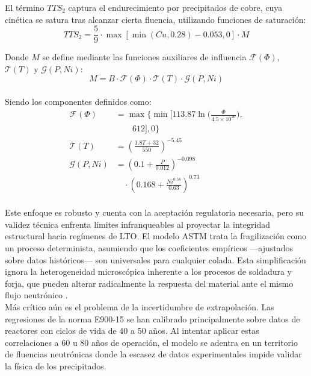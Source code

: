 \documentclass[a4paper, 12pt, twocolumn]{book}
\begin{document}
El término $TTS_2$ captura el endurecimiento por precipitados de cobre, cuya cinética se satura tras alcanzar cierta fluencia, utilizando funciones de saturación:\\
$$ TTS_2 = \frac{5}{9} \cdot \max \left[ \min (Cu, 0.28) - 0.053, 0 \right] \cdot M $$

Donde $M$ se define mediante las funciones auxiliares de influencia $\mathcal{F}(\Phi)$, $\mathcal{T}(T)$ y $\mathcal{G}(P, Ni)$:\\

\begin{equation}
M = B \cdot \mathcal{F}(\Phi) \cdot \mathcal{T}(T) \cdot \mathcal{G}(P, Ni)
\end{equation}\\

Siendo los componentes definidos como:\\

{\small
\begin{align*}
\mathcal{F}(\Phi) &= \max \bigg\{ \min \Big[ 113.87 \ln \Big( \frac{\Phi}{4.5 \times 10^{20}} \Big), \\
& \quad \quad 612 \Big], 0 \bigg\} \\[6pt]
\mathcal{T}(T) &= \left( \frac{1.8T + 32}{550} \right)^{-5.45} \\[6pt]
\mathcal{G}(P, Ni) &= \left( 0.1 + \frac{P}{0.012} \right)^{-0.098} \\
& \quad \cdot \left( 0.168 + \frac{Ni^{0.58}}{0.63} \right)^{0.73}
\end{align*}
}\\

Este enfoque es robusto y cuenta con la aceptación regulatoria necesaria, pero su validez técnica enfrenta límites infranqueables al proyectar la integridad estructural hacia regímenes de LTO. El modelo ASTM trata la fragilización como un proceso determinista, asumiendo que los coeficientes empíricos —ajustados sobre datos históricos— son universales para cualquier colada. Esta simplificación ignora la heterogeneidad microscópica inherente a los procesos de soldadura y forja, que pueden alterar radicalmente la respuesta del material ante el mismo flujo neutrónico \parencite{eason2013}.\\

Más crítico aún es el problema de la incertidumbre de extrapolación. Las regresiones de la norma E900-15 se han calibrado principalmente sobre datos de reactores con ciclos de vida de 40 a 50 años. Al intentar aplicar estas correlaciones a 60 u 80 años de operación, el modelo se adentra en un territorio de fluencias neutrónicas donde la escasez de datos experimentales impide validar la física de los precipitados. \\
\end{document}
